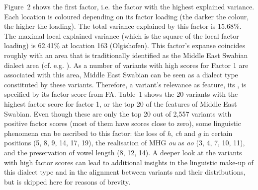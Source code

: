 \documentclass[output=paper]{LSP/langsci}
\begin{document}
Figure~2 shows the first factor, i.e. the factor with the highest explained variance. Each location is coloured depending on its factor loading (the darker the colour, the higher the loading). The total variance explained by this factor is 15.68\%. The maximal local explained variance (which is the square of the local factor loading) is 62.41\% at location 163 (Olgishofen). This factor’s expanse coincides roughly with an area that is traditionally identified as the Middle East Swabian dialect area (cf. e.g. \citealt[118]{nubling_studien_1988}). As a number of variants with high scores for Factor 1 are associated with this area, Middle East Swabian can be seen as a dialect type constituted by these variants. Therefore, a variant’s relevance as feature, its , is specified by its factor score from FA. Table~1 shows the 20 variants with the highest factor score for factor 1, or the top 20 of the features of Middle East Swabian. Even though these are only the top 20 out of 2,557 variants with positive factor scores (most of them have scores close to zero), some linguistic phenomena can be ascribed to this factor: the loss of \textit{h}, \textit{ch} and \textit{g} in certain positions (5, 8, 9, 14, 17, 19), the realisation of MHG \textit{ou} as \textit{ao} (3, 4, 7, 10, 11), and the preservation of vowel length (8, 12, 14). A deeper look at the variants with high factor scores can lead to additional insights in the linguistic make-up of this dialect type and in the alignment between variants and their distributions, but is skipped here for reasons of brevity. 
\end{document}
